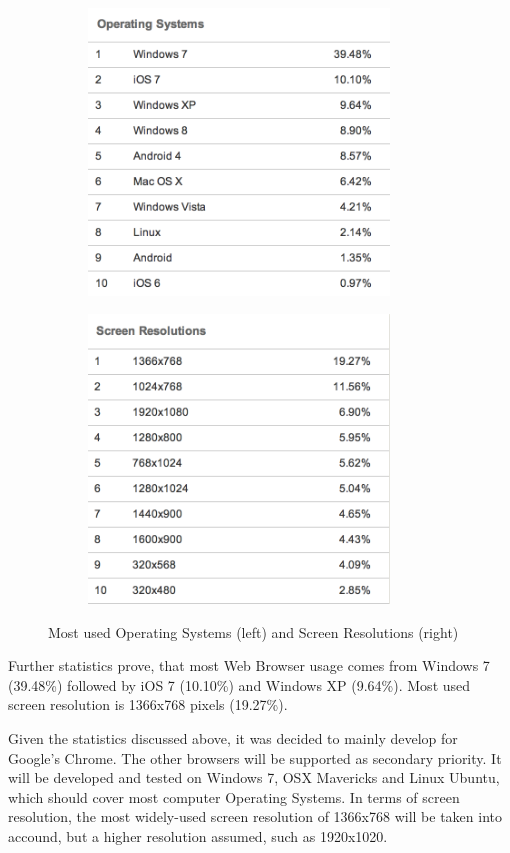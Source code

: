 \documentclass[a4paper,11pt,titlepage]{article}
\begin{document}
\begin{figure}
\centering
\begin{subfigure}{.5\textwidth}
  \centering
  \includegraphics[width=80mm]{graphics/webStats_03.png}
  \label{fig:sub1}
\end{subfigure}%
\begin{subfigure}{.5\textwidth}
  \centering
  \includegraphics[width=80mm]{graphics/webStats_04.png}

  \label{fig:sub2}
\end{subfigure}

\caption{Most used Operating Systems (left) and Screen Resolutions (right)}

\end{figure}

Further statistics prove, that most Web Browser usage comes from Windows 7 (39.48\%) followed by iOS 7 (10.10\%) and Windows XP (9.64\%). Most used screen resolution is 1366x768 pixels (19.27\%).

Given the statistics discussed above, it was decided to mainly develop for Google's Chrome. The other browsers will be supported as secondary priority. It will be developed and tested on Windows 7, OSX Mavericks and Linux Ubuntu, which should cover most computer Operating Systems. In terms of screen resolution, the most widely-used screen resolution of 1366x768 will be taken into accound, but a higher resolution assumed, such as 1920x1020.
\end{document}
